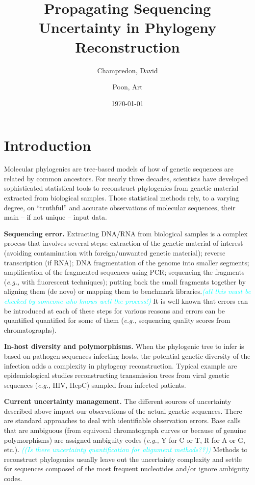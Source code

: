 \documentclass[10pt]{article}
\title{Propagating Sequencing Uncertainty in Phylogeny Reconstruction}
\author{Champredon, David \and Poon, Art}
\date{\today}
\newcommand{\comment}[1]{\textsl{\textcolor{cyan}{#1}}}
\newcommand{\eg}{\textit{e.g.,}\xspace}
\begin{document}
\maketitle
\linenumbers

\section{Introduction}

Molecular phylogenies are tree-based models of how of genetic sequences are related by common ancestors.
For nearly three decades, scientists have developed sophisticated statistical tools to reconstruct phylogenies from genetic material extracted from biological samples. 
Those statistical methods rely, to a varying degree, on ``truthful'' and accurate observations of molecular sequences, their main -- if not unique -- input data.

\textbf{Sequencing error.} 
Extracting DNA/RNA from biological samples is a complex process that involves several steps: extraction of the genetic material of interest (avoiding contamination with foreign/unwanted genetic material); reverse transcription (if RNA); DNA fragmentation of the genome into smaller segments; amplification of the fragmented sequences using PCR; sequencing the fragments (\eg with fluorescent techniques); putting back the small fragments together by aligning them (de novo) or mapping them to benchmark libraries.\comment{(all this must be checked by someone who knows well the process!)}
It is well known that errors can be introduced at each of these steps for various reasons and errors can be quantified quantified for some of them (\eg sequencing quality scores from chromatographs). 

\textbf{In-host diversity and polymorphisms.} 
When the phylogenic tree to infer is based on pathogen sequences infecting hosts, the potential genetic diversity of the infection adds a complexity in phylogeny reconstruction. Typical example are epidemiological studies reconstructing transmission trees from viral genetic sequences (\eg HIV, HepC) sampled from infected patients. 


\textbf{Current uncertainty management.} 
The different sources of uncertainty described above impact our observations of the actual genetic sequences.
There are standard approaches to deal with identifiable observation errors. 
Base calls that are ambiguous (from equivocal chromatograph curves or because of genuine polymorphisms) are assigned ambiguity codes (\eg Y for C or T, R for A or G, etc.).
\comment{((Is there uncertainty quantification for alignment methods??))}
Methods to reconstruct phylogenies usually leave out the uncertainty complexity and settle for sequences composed of the most frequent nucleotides and/or ignore ambiguity codes.
\end{document}
